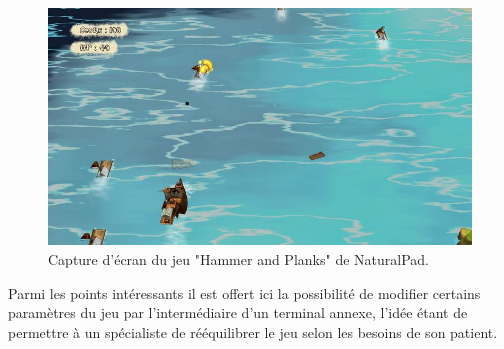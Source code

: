 \begin{figure}[h!]
\centering
\includegraphics[width=1.0\linewidth]{images/hammer_and_planks}
\caption{Capture d'écran du jeu "Hammer and Planks" de 
NaturalPad.}
\label{fig:hammer_planks}
\end{figure}

Parmi les points intéressants il est offert ici la possibilité de modifier certains
paramètres du jeu par l'intermédiaire d'un terminal annexe, l'idée étant de
permettre à un spécialiste de rééquilibrer le jeu selon les besoins de son
patient.
